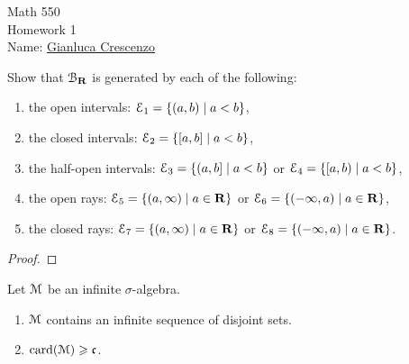\documentclass[10pt,twoside,openany]{memoir}
\begin{document}
\begin{center}
    {\Large Math 550 \\[0.1in]Homework 1}\\[.175in]
    {Name:} {\underline{Gianluca Crescenzo\hspace*{2in}}}\\[0.15in]
    \end{center}
    \vspace{4pt}
\begin{exercise}
    Show that $\mathcal{B}_{\mathbf{R}}$ is generated by each of the following:
        \begin{enumerate}[label = \alph*.,itemsep=1pt,topsep=3pt]
            \item the open intervals: $\mathcal{E}_1 = \{(a,b) \mid a < b\}$,
            \item the closed intervals: $\mathcal{E}_2 = \{[a,b] \mid a < b\}$,
            \item the half-open intervals: $\mathcal{E}_3 = \{(a,b] \mid a < b\}$ or $\mathcal{E}_4 = \{[a,b) \mid a < b\}$,
            \item the open rays: $\mathcal{E}_5 = \{(a,\infty) \mid a \in \mathbf{R}\}$ or $\mathcal{E}_6 = \{(-\infty,a) \mid a \in \mathbf{R}\}$,
            \item the closed rays: $\mathcal{E}_7 = \{(a,\infty) \mid a \in \mathbf{R}\}$ or $\mathcal{E}_8 = \{(-\infty,a) \mid a \in \mathbf{R}\}$.
        \end{enumerate}
\end{exercise}
    {\color{blue} \begin{proof}
    
    \end{proof}}
\begin{exercise}
    Let $\mathcal{M}$ be an infinite $\sigma$-algebra.
        \begin{enumerate}[label = \alph*.,itemsep=1pt,topsep=3pt]
            \item $\mathcal{M}$ contains an infinite sequence of disjoint sets.
            \item $\operatorname{card}(\mathcal{M}) \geqslant \mathfrak{c}$.
        \end{enumerate}
\end{exercise}
\end{document}
